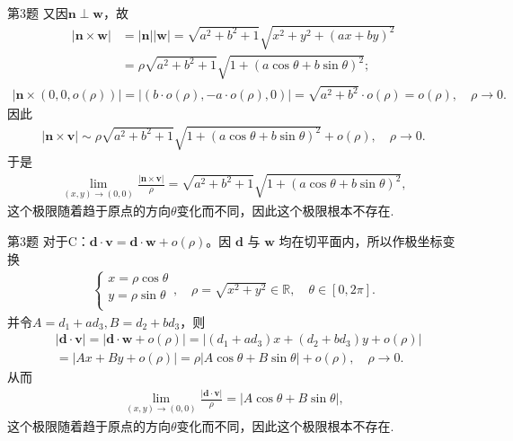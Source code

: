 \documentclass[aspectratio=169]{beamer}
\begin{document}
\begin{frame}{第3题}
又因$\boldsymbol{n}\perp\boldsymbol{w}$，故
\begin{align*}
\left| \boldsymbol{n}\times \boldsymbol{w} \right|&=\left| \boldsymbol{n} \right|\left| \boldsymbol{w} \right|=\sqrt{a^2+b^2+1}\sqrt{x^2+y^2+\left( ax+by \right) ^2}
\\
&=\rho \sqrt{a^2+b^2+1}\sqrt{1+\left( a\cos \theta +b\sin \theta \right) ^2};
\end{align*}
\begin{align*}
\left| \boldsymbol{n}\times \left( 0,0,o\left( \rho \right) \right) \right|=\left| \left( b\cdot o\left( \rho \right) ,-a\cdot o\left( \rho \right) ,0 \right) \right|=\sqrt{a^2+b^2}\cdot o\left( \rho \right) = o\left( \rho \right) ,\quad \rho \rightarrow 0.
\end{align*}
因此
\begin{align*}
\left| \boldsymbol{n}\times \boldsymbol{v} \right|\sim \rho \sqrt{a^2+b^2+1}\sqrt{1+\left( a\cos \theta +b\sin \theta \right) ^2}+o\left( \rho \right) ,\quad \rho \rightarrow 0.
\end{align*}
于是
\begin{align*}
\underset{\left( x,y \right) \rightarrow \left( 0,0 \right)}{\lim}\frac{\left| \boldsymbol{n}\times \boldsymbol{v} \right|}{\rho}=\sqrt{a^2+b^2+1}\sqrt{1+\left( a\cos \theta +b\sin \theta \right) ^2},
\end{align*}
这个极限随着趋于原点的方向$\theta$变化而不同，因此这个极限根本不存在.
\end{frame}

\begin{frame}{第3题}
对于C：$\boldsymbol{d}\cdot\boldsymbol{v}=\boldsymbol{d}\cdot\boldsymbol{w}+o(\rho)$。因 $\boldsymbol{d}$ 与 $\boldsymbol{w}$ 均在切平面内，所以作极坐标变换
\begin{align*}
\begin{cases}
x=\rho \cos \theta\\
y=\rho \sin \theta\\
\end{cases},\quad \rho =\sqrt{x^2+y^2}\in \mathbb{R} ,\quad \theta \in \left[ 0,2\pi \right] .
\end{align*}
并令$A=d_1+ad_3,B=d_2+bd_3$，则
\begin{align*}
&\left| \boldsymbol{d}\cdot \boldsymbol{v} \right|=\left| \boldsymbol{d}\cdot \boldsymbol{w}+o\left( \rho \right) \right|=\left| \left( d_1+ad_3 \right) x+\left( d_2+bd_3 \right) y+o\left( \rho \right) \right|
\\
&=\left| Ax+By+o\left( \rho \right) \right|=\rho \left| A\cos \theta +B\sin \theta \right|+o\left( \rho \right) ,\quad \rho \rightarrow 0.
\end{align*}
从而
\begin{align*}
\underset{\left( x,y \right) \rightarrow \left( 0,0 \right)}{\lim}\frac{\left| \boldsymbol{d}\cdot \boldsymbol{v} \right|}{\rho}=\left| A\cos \theta +B\sin \theta \right|,
\end{align*}
这个极限随着趋于原点的方向$\theta$变化而不同，因此这个极限根本不存在.
\end{frame}
\end{document}
